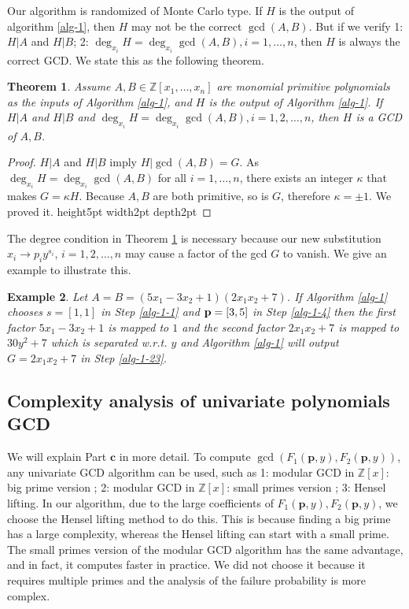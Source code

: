 \documentclass[final,20pt]{elsarticle}
\newtheorem{theorem}{Theorem}[section]
\newtheorem{example}[theorem]{Example}
\def\Z{{\mathbb Z}}
\def\qed{\hfil {\vrule height5pt width2pt depth2pt}}
\begin{document}
\vspace{11pt}
Our algorithm is randomized of Monte Carlo type. If $H$ is the output of algorithm \ref{alg-1}, then $H$ may not be the correct $\gcd(A,B)$. But if we verify 1: $H|A$ and $H|B$; 2: $\deg_{x_i}H=\deg_{x_i}\gcd(A,B),i=1,\dots,n$, then $H$ is always the correct GCD.
%
We state this as the following theorem.


\begin{theorem}\label{the-15}
Assume $A,B\in\Z[x_1,\dots,x_n]$ are monomial primitive polynomials as the inputs of Algorithm \ref{alg-1}, and $H$ is the output of Algorithm \ref{alg-1}. If $H|A$ and $H|B$ and
$\deg_{x_i}H=\deg_{x_i}\gcd(A,B),i=1,2,\dots,n$, then $H$ is a GCD of $A,B$.
\end{theorem}
\begin{proof}
$H|A$ and $H|B$ imply $H|\gcd(A,B)=G$. As $\deg_{x_i}H=\deg_{x_i}\gcd(A,B)$ for all $i=1,\dots,n$, there exists an integer $\kappa$ that makes $G=\kappa H$. Because $A,B$ are both primitive, so is $G$, therefore $\kappa = \pm 1$.  We proved it. \qed
\end{proof}


The  degree condition in Theorem \ref{the-15} is necessary because our new substitution $x_i \rightarrow p_i y^{s_i}$, $i=1,2,\dots,n$ may cause a factor of the gcd $G$ to vanish.  We give an example to illustrate this.

\begin{example}
    Let $A=B=(5x_1 - 3x_2+1)(2x_1x_2+7)$.  If Algorithm \ref{alg-1} chooses $s = [1,1]$ in Step \ref{alg-1-1} and ${\bf p}=[3,5]$ in Step \ref{alg-1-4} then the first factor $5x_1-3x_2+1$ is mapped to $1$ and the second factor $2x_1x_2+7$ is mapped to $30y^2+7$ which is separated w.r.t. $y$ and Algorithm \ref{alg-1} will output $G=2x_1x_2+7$ in Step \ref{alg-1-23}.
\end{example}


\subsection{Complexity analysis of univariate polynomials GCD}

We will explain Part $\mathbf{c}$ in more detail.
%
To compute $\gcd(F_1(\mathbf{p},y),F_2(\mathbf{p},y))$,  any univariate GCD algorithm can be used, such as 1: modular GCD in $\Z[x]$: big prime version \cite[p166, Alg. 6.34]{GaGer13};  2: modular GCD in $\Z[x]$: small primes version \cite[p170, Alg. 6.38]{GaGer13}; 3: Hensel lifting.
%
In our algorithm, due to the large coefficients of $F_1(\mathbf{p},y),F_2(\mathbf{p},y)$, we choose the Hensel lifting method to do this. This is because finding a big prime has a large complexity, whereas the Hensel lifting can start with a small prime.
%
The small primes version of the modular GCD algorithm has the same advantage, and in fact, it computes faster in practice. We did not choose it because it requires multiple primes and the analysis of the failure probability is more complex.
\end{document}
